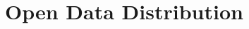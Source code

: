 \documentclass[10pt,twocolumn,letterpaper]{article}
\begin{document}


\section{Open Data Distribution}
\label{sec:distribution}

  





\end{document}

